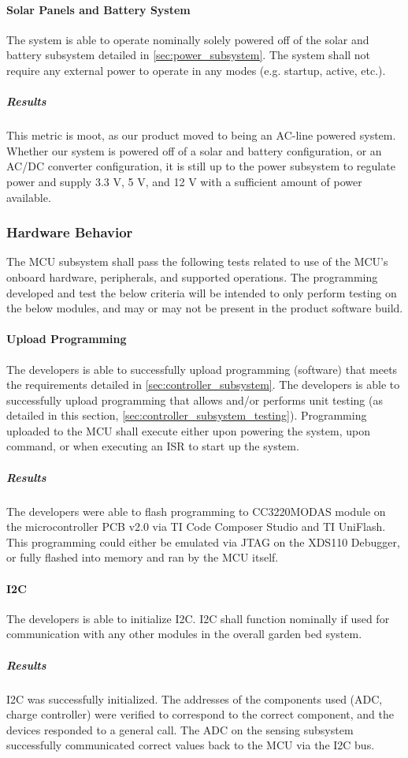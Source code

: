 \paragraph{Solar Panels and Battery System} The system is able to
operate nominally solely powered off of the solar and battery subsystem
detailed in \autoref{sec:power_subsystem}. The system shall not require any
external power to operate in any modes (e.g. startup, active, etc.).
\subparagraph{Results} This metric is moot, as our product moved to being an AC-line powered system. Whether our system is powered off of a solar and battery configuration, or an AC/DC converter configuration, it is still up to the power subsystem to regulate power and supply 3.3 V, 5 V, and 12 V with a sufficient amount of power available.

\subsubsection{Hardware Behavior}
The MCU subsystem shall pass the following tests related to use of the
MCU's onboard hardware, peripherals, and supported operations. The
programming developed and test the below criteria will be intended to only
perform testing on the below modules, and may or may not be present in the
product software build.

\paragraph{Upload Programming} The developers is able to successfully
upload programming (software) that meets the requirements detailed in
\autoref{sec:controller_subsystem}. The developers is able to
successfully upload programming that allows and/or performs unit testing
(as detailed in this section, \autoref{sec:controller_subsystem_testing}).
Programming uploaded to the MCU shall execute either upon powering the
system, upon command, or when executing an ISR to start up the system.
\subparagraph{Results} The developers were able to flash programming to CC3220MODAS module on the microcontroller PCB v2.0 via TI Code Composer Studio and TI UniFlash. This programming could either be emulated via JTAG on the XDS110 Debugger, or fully flashed into memory and ran by the MCU itself. 

\paragraph{I2C} The developers is able to initialize I2C. I2C shall
function nominally if used for communication with any other modules in the
overall garden bed system.
\subparagraph{Results} I2C was successfully initialized. The addresses of the components used (ADC, charge controller) were verified to correspond to the correct component, and the devices responded to a general call. The ADC on the sensing subsystem successfully communicated correct values back to the MCU via the I2C bus.

